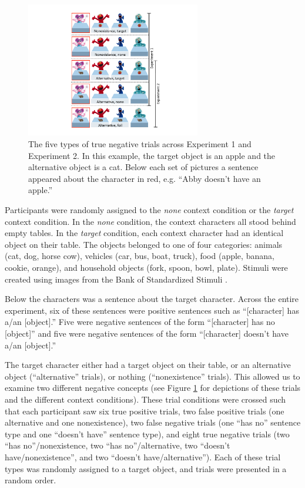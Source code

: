 \documentclass[10pt,letterpaper]{article}
\begin{document}
\begin{figure}[t]
\begin{center} 
\includegraphics[width=3in]{figures/trialtypes.pdf}
\caption{\label{fig:trial} The five types of true negative trials across Experiment 1 and Experiment 2.  In this example, the target object is an apple and the alternative object is a cat. Below each set of pictures a sentence appeared about the character in red, e.g. ``Abby doesn't have an apple.''}  
\end{center} 
\end{figure}

Participants were randomly assigned to the \emph{none} context condition or the \emph{target} context condition.  In the \emph{none} condition, the context characters all stood behind empty tables.  In the \emph{target} condition, each context character had an identical object on their table.  The objects belonged to one of four categories: animals (cat, dog, horse cow), vehicles (car, bus, boat, truck), food (apple, banana, cookie, orange), and household objects (fork, spoon, bowl, plate).  Stimuli were created using images from the Bank of Standardized Stimuli \cite{brodeur2010}.  

Below the characters was a sentence about the target character.  Across the entire experiment, six of these sentences were positive sentences such as ``[character] has a/an [object].''  Five were negative sentences of the form ``[character] has no [object]'' and five were negative sentences of the form ``[character] doesn't have a/an [object].'' 

The target character either had a target object on their table, or an alternative object (``alternative'' trials), or nothing (``nonexistence'' trials).  This allowed us to examine two different negative concepts (see Figure \ref{fig:trial} for depictions of these trials and the different context conditions).    These trial conditions were crossed such that each participant saw six true positive trials, two false positive trials (one alternative and one nonexistence), two false negative trials (one ``has no'' sentence type and one ``doesn't have'' sentence type), and eight true negative trials (two ``has no''/nonexistence, two ``has no''/alternative, two ``doesn't have/nonexistence'', and two ``doesn't have/alternative'').  Each of these trial types was randomly assigned to a target object, and trials were presented in a random order.  
\end{document}
